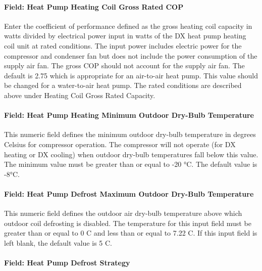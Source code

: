 \paragraph{Field: Heat Pump Heating Coil Gross Rated COP}\label{field-heat-pump-heating-coil-gross-rated-cop-3}

Enter the coefficient of performance defined as the gross heating coil capacity in watts divided by electrical power input in watts of the DX heat pump heating coil unit at rated conditions. The input power includes electric power for the compressor and condenser fan but does not include the power consumption of the supply air fan. The gross COP should not account for the supply air fan. The default is 2.75 which is appropriate for an air-to-air heat pump. This value should be changed for a water-to-air heat pump. The rated conditions are described above under Heating Coil Gross Rated Capacity.

\paragraph{Field: Heat Pump Heating Minimum Outdoor Dry-Bulb Temperature}\label{field-heat-pump-heating-minimum-outdoor-dry-bulb-temperature-2}

This numeric field defines the minimum outdoor dry-bulb temperature in degrees Celsius for compressor operation. The compressor will not operate (for DX heating or DX cooling) when outdoor dry-bulb temperatures fall below this value. The minimum value must be greater than or equal to -20 °C. The default value is -8°C.

\paragraph{Field: Heat Pump Defrost Maximum Outdoor Dry-Bulb Temperature}\label{field-heat-pump-defrost-maximum-outdoor-dry-bulb-temperature-2}

This numeric field defines the outdoor air dry-bulb temperature above which outdoor coil defrosting is disabled. The temperature for this input field must be greater than or equal to 0 C and less than or equal to 7.22 C. If this input field is left blank, the default value is 5 C.

\paragraph{Field: Heat Pump Defrost Strategy}\label{field-heat-pump-defrost-strategy-2}

